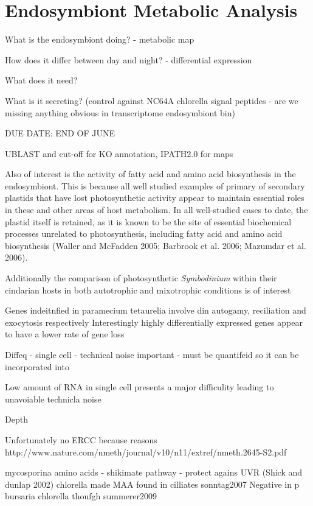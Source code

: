 \graphicspath{{chapters/6.Chapter_4/figures}}

\chapter{Endosymbiont Metabolic Analysis}

What is the endosymbiont doing? - metabolic map

How does it differ between day and night? - differential expression

What does it need?

What is it secreting? (control against NC64A chlorella signal peptides - are we missing anything obvious in transcriptome endosymbiont bin)

DUE DATE: END OF JUNE


UBLAST and cut-off for KO annotation, IPATH2.0 for maps  \citep{Wisecaver2014}




Also of interest is the activity of fatty acid and amino acid biosynthesis in the endosymbiont.  This is because
all well studied examples of primary of secondary plastids that have lost photosynthetic activity appear to maintain 
essential roles in these and other areas of host metabolism.
In all well-studied cases to date, the plastid itself is retained, as it is known to be the site of essential biochemical processes unrelated to photosynthesis, including fatty acid and amino acid biosynthesis (Waller and McFadden 2005; Barbrook et al. 2006; Mazumdar et al. 2006). \citep{Donaher2009}



Additionally the comparison of photosynthetic \textit{Symbodinium} within their cindarian hosts in both autotrophic and mixotrophic conditions
is of interest \citep{Xiang2015}


Genes indeitnfied in paramecium tetaurelia involve din autogamy, reciliation and exocytosis respectively \citep{Arnaiz2010}
Interestingly highly differentially expressed genes appear to have a lower rate of gene loss \citep{Arnaiz2010}




Diffeq - single cell - technical noise important - must be quantifeid so it can be incorporated into 

Low amount of RNA in single cell presents a major difficulity leading to unavoiable technicla noise \citep{Brennecke2013}

Depth


Unfortunately no ERCC because reasons
http://www.nature.com/nmeth/journal/v10/n11/extref/nmeth.2645-S2.pdf




mycosporina amino acids - shikimate pathway - protect agains UVR \citep{Sommaruga2009} (Shick and dunlap 2002)
chlorella made MAA found in cilliates sonntag2007 
Negative in p bursaria chlorella thoufgh summerer2009


